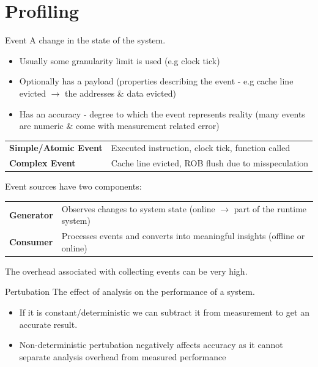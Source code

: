 \chapter{Profiling}

\begin{definitionbox}{Event}
    A change in the state of the system.
    \begin{itemize}
        \item Usually some granularity limit is used (e.g clock tick)
        \item Optionally has a payload (properties describing the event - e.g cache line evicted $\to$ the addresses \& data evicted)
        \item Has an accuracy - degree to which the event represents reality (many events are numeric \& come with measurement related error)
    \end{itemize}
    \begin{center}
        \begin{tabular}{l p{}}
            \textbf{Simple/Atomic Event} & Executed instruction, clock tick, function called \\
            \textbf{Complex Event} & Cache line evicted, ROB flush due to misspeculation \\
        \end{tabular}
    \end{center}
    Event sources have two components:
    \begin{center}
        \begin{tabular}{l p{}}
            \textbf{Generator} & Observes changes to system state (online $\to$ part of the runtime system) \\
            \textbf{Consumer} & Processes events and converts into meaningful insights (offline or online)
        \end{tabular}
    \end{center}
    The overhead associated with collecting events can be very high.
\end{definitionbox}

\begin{definitionbox}{Pertubation}
    The effect of analysis on the performance of a system.
    \begin{itemize}
        \item If it is constant/deterministic we can subtract it from measurement to get an accurate result.
        \item Non-deterministic pertubation negatively affects accuracy as it cannot separate analysis overhead from measured performance
    \end{itemize}
\end{definitionbox}

